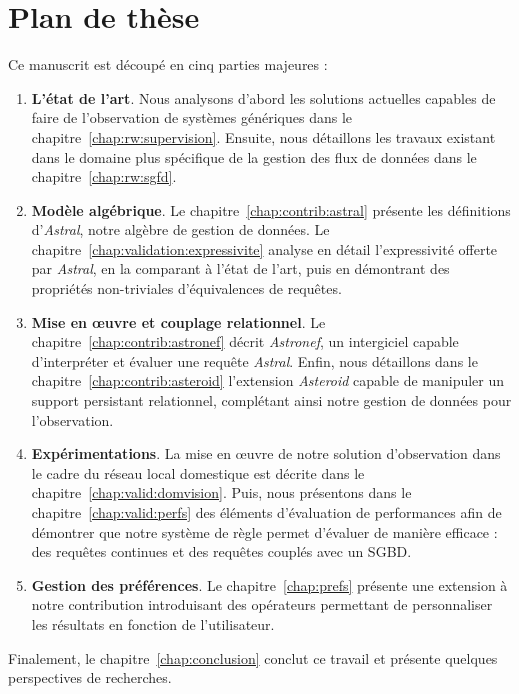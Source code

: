 \section{Plan de thèse}\label{sec:intro:plan}
Ce manuscrit est découpé en cinq parties majeures :
\begin{enumerate}
\item \textbf{L'état de l'art}. Nous analysons d'abord les solutions actuelles capables de faire de l'observation de systèmes génériques dans le chapitre~\ref{chap:rw:supervision}. Ensuite, nous détaillons les travaux existant dans le domaine plus spécifique de la gestion des flux de données dans le chapitre~\ref{chap:rw:sgfd}.
\item \textbf{Modèle algébrique}. Le chapitre~\ref{chap:contrib:astral} présente les définitions d'\textit{Astral}, notre algèbre de gestion de données. Le chapitre~\ref{chap:validation:expressivite} analyse en détail l'expressivité offerte par \textit{Astral}, en la comparant à l'état de l'art, puis en démontrant des propriétés non-triviales d'équivalences de requêtes. 
\item \textbf{Mise en œuvre et couplage relationnel}. Le chapitre~\ref{chap:contrib:astronef} décrit \textit{Astronef}, un intergiciel capable d'interpréter et évaluer une requête \textit{Astral}. Enfin, nous détaillons dans le chapitre~\ref{chap:contrib:asteroid} l'extension \textit{Asteroid} capable de manipuler un support persistant relationnel, complétant ainsi notre gestion de données pour l'observation.
\item \textbf{Expérimentations}. La mise en œuvre de notre solution d'observation dans le cadre du réseau local domestique est décrite dans le chapitre~\ref{chap:valid:domvision}. Puis, nous présentons dans le chapitre~\ref{chap:valid:perfs} des éléments d'évaluation de performances afin de démontrer que notre système de règle permet d'évaluer de manière efficace : des requêtes continues et des requêtes couplés avec un SGBD.
\item \textbf{Gestion des préférences}. Le chapitre~\ref{chap:prefs} présente une extension à notre contribution introduisant des opérateurs permettant de personnaliser les résultats en fonction de l'utilisateur.
\end{enumerate}

Finalement, le chapitre~\ref{chap:conclusion} conclut ce travail et présente quelques perspectives de recherches.